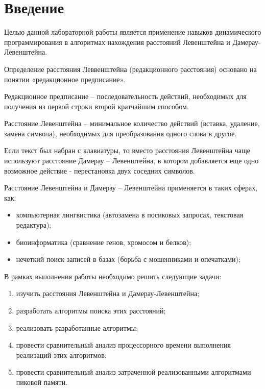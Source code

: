 \chapter*{Введение}

Целью данной лабораторной работы является применение навыков динамического программирования в алгоритмах нахождения расстояний Левенштейна и Дамерау-Левенштейна.

Определение расстояния Леввенштейна (редакционного расстояния) основано на понятии «редакционное предписание».

Редакционное предписание – последовательность действий, необходимых для получения из первой строки второй кратчайшим способом. 

Расстояние Левенштейна – минимальное количество действий (вставка, удаление, замена символа), необходимых для преобразования одного слова в другое. 

Если текст был набран с клавиатуры, то вместо расстояния Левенштейна чаще используют расстояние Дамерау – Левенштейна, в котором добавляется еще одно возможное действие - перестановка двух соседних символов.~\cite{Passenger}

Расстояние Левенштейна и Дамерау – Левенштейна применяется в таких сферах, как: 
\begin{itemize}
	\item компьютерная лингвистика (автозамена в посиковых запросах, текстовая редактура);
	\item биоинформатика (сравнение генов, хромосом и белков);
	\item нечеткий поиск записей в базах (борьба с мошенниками и опечатками);
\end{itemize}

В рамках выполнения работы необходимо решить следующие задачи: 
\begin{enumerate}[label={\arabic*)}]
	\item изучить расстояния Левенштейна и Дамерау-Левенштейна;
	\item разработать алгоритмы поиска этих расстояний;
	\item реализовать разработанные алгоритмы;
	\item провести сравнительный анализ процессорного времени выполнения реализаций этих алгоритмов;
	\item провести сравнительный анализ затраченной реализованными алгоритмами пиковой памяти.
\end{enumerate}
